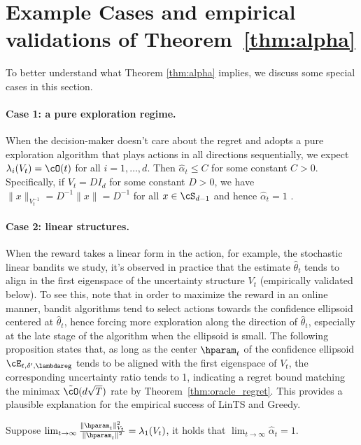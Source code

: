 \section{Example Cases and empirical validations of Theorem~\ref{thm:alpha}}
\label{sec:Cases}

To better understand what Theorem \ref{thm:alpha} implies, we discuss some special cases in this section. 

\paragraph{Case 1: a pure exploration regime.} \label{eg:pure} When the decision-maker doesn't care about the regret and adopts a pure exploration algorithm that plays actions in all directions sequentially, we expect $\lambda_i(V_t) = \cO(t)$ for all $i = 1,\dots, d$. Then $\hat{\alpha}_t \leq C$ for some constant $C>0$. Specifically, if $V_t = D I_d$ for some constant $D>0$, we have $\|x\|_{V_t^{-1}} =D^{-1} \|x\| = D^{-1}$ for all $x \in \cS_{d-1}$ and hence $ \hat{\alpha}_t = 1$  .

\paragraph{Case 2:  linear structures.} 
\label{eg:principle_eigen}

When the reward takes a linear form in the action, for example, the stochastic linear bandits we study,  it's observed in practice that the estimate $\hat{\theta}_t$ tends to align in the first eigenspace of the uncertainty structure $V_t$ (empirically validated below). To see this, note that in order to maximize the reward in an online manner, bandit algorithms tend to select actions towards the confidence ellipsoid centered at  $\hat{\theta}_t$, hence forcing more exploration along the direction of $\hat{\theta}_t$, especially at the late stage of the algorithm when the ellipsoid is small. The following proposition states that, as long as the center $\hparam_t$ of the confidence ellipsoid $\cE_{t,\delta^\prime, \lambdareg}$  tends to be aligned with the first eigenspace of $V_t$, the corresponding uncertainty ratio tends to 1, indicating a regret bound matching the minimax $\tilde{\cO}(d\sqrt{T})$ rate by Theorem~\ref{thm:oracle_regret}. This provides a plausible explanation for the empirical success of LinTS and Greedy.
\begin{proposition}\label{prop:align}
	 Suppose $\lim_{t\to \infty}\frac{\|\hparam_t\|_{V_{t}}^2}{\|\hparam_t\|^2} =\lambda_{1}(V_{t}) $, it holds that $\lim_{t\to \infty} \hat{\alpha}_t = 1$.	
\end{proposition}



